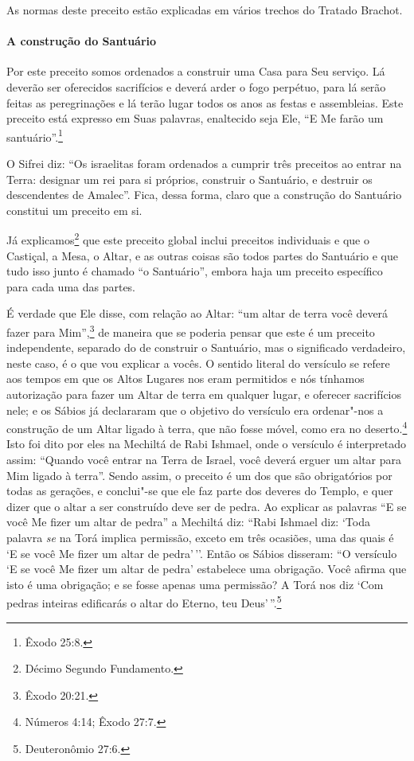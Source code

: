 \begin{multicols}{2}
As normas deste preceito estão explicadas em vários trechos do Tratado
Brachot\starr.

\paragraph{A construção do Santuário}

Por este preceito somos ordenados a construir uma Casa para Seu serviço.
Lá deverão ser oferecidos sacrifícios e deverá arder o fogo perpétuo,
para lá serão feitas as peregrinações e lá terão lugar todos os anos as
festas e assembleias. Este preceito está expresso em Suas palavras,
enaltecido seja Ele, ``E Me farão um santuário''.\footnote{Êxodo 25:8.}

O Sifrei\starr{} diz: ``Os israelitas foram ordenados a cumprir três preceitos
ao entrar na Terra: designar um rei para si próprios, construir o
Santuário, e destruir os descendentes de Amalec\starr''. Fica, dessa forma,
claro que a construção do Santuário constitui um preceito em si.

Já explicamos\footnote{Décimo Segundo Fundamento.} que este preceito global inclui
preceitos individuais e que o Castiçal, a Mesa, o Altar, e as outras coisas são todos partes do Santuário e que tudo isso junto é chamado ``o Santuário'', embora
haja um preceito específico para cada uma das partes.

É verdade que Ele disse, com relação ao Altar: ``um altar de terra você
deverá fazer para Mim'',\footnote{Êxodo 20:21.} de maneira que se poderia pensar
que este é um preceito independente, separado do de construir o
Santuário, mas o significado verdadeiro, neste caso, é o que vou
explicar a vocês. O sentido literal do versículo se refere aos tempos
em que os Altos Lugares nos eram permitidos e nós tínhamos autorização
para fazer um Altar de terra em qualquer lugar, e oferecer sacrifícios
nele; e os Sábios já declararam que o objetivo do versículo era
ordenar"-nos a construção de um Altar ligado à terra, que não fosse
móvel, como era no deserto.\footnote{Números 4:14; Êxodo 27:7.} Isto foi dito por eles
na Mechiltá\starr{} de Rabi Ishmael\starr, onde o versículo é interpretado assim:
``Quando você entrar na Terra de Israel, você deverá erguer um altar
para Mim ligado à terra''. Sendo assim, o preceito é um dos que são
obrigatórios por todas as gerações, e conclui"-se que ele faz parte dos
deveres do Templo, e quer dizer que o altar a ser construído deve ser
de pedra. Ao explicar as palavras ``E se você Me fizer um altar de
pedra'' a Mechiltá\starr{} diz: ``Rabi Ishmael\starr{} diz: `Toda palavra \emph{se} na
Torá\starr{} implica permissão, exceto em três ocasiões, uma das quais é `E se
você Me fizer um altar de pedra'\,''. Então os Sábios disseram: ``O
versículo `E se você Me fizer um altar de pedra' estabelece uma
obrigação. Você afirma que isto é uma obrigação; e se fosse apenas uma
permissão? A Torá\starr{} nos diz `Com pedras inteiras edificarás o altar do
Eterno, teu Deus'\,''.\footnote{Deuteronômio 27:6.}


\end{multicols}
